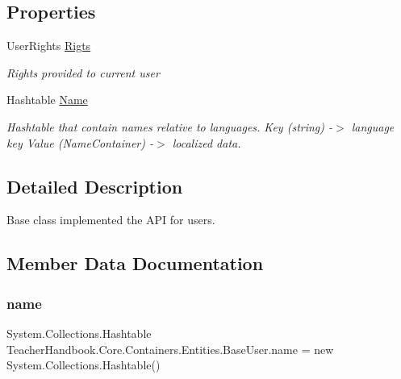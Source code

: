 \subsection*{Properties}
\begin{DoxyCompactItemize}
\item 
User\+Rights \mbox{\hyperlink{class_teacher_handbook_1_1_core_1_1_containers_1_1_entities_1_1_base_user_a0aeebd3854d7996435cdb2fc691c2bc3}{Rigts}}
\begin{DoxyCompactList}\small\item\em Rights provided to current user \end{DoxyCompactList}\item 
Hashtable \mbox{\hyperlink{class_teacher_handbook_1_1_core_1_1_containers_1_1_entities_1_1_base_user_a53a606a419de1741eb85a13062267be9}{Name}}
\begin{DoxyCompactList}\small\item\em Hashtable that contain names relative to languages. Key (string) -\/$>$ language key Value (Name\+Container) -\/$>$ localized data. \end{DoxyCompactList}\end{DoxyCompactItemize}


\subsection{Detailed Description}
Base class implemented the A\+PI for users. 



\subsection{Member Data Documentation}
\mbox{\label{class_teacher_handbook_1_1_core_1_1_containers_1_1_entities_1_1_base_user_ad8da6882147f62d42960e2a436b8dff1}} 
\subsubsection{\texorpdfstring{name}{name}}
{\footnotesize\ttfamily System.\+Collections.\+Hashtable Teacher\+Handbook.\+Core.\+Containers.\+Entities.\+Base\+User.\+name = new System.\+Collections.\+Hashtable()\hspace{0.3cm}{\ttfamily [protected]}}



